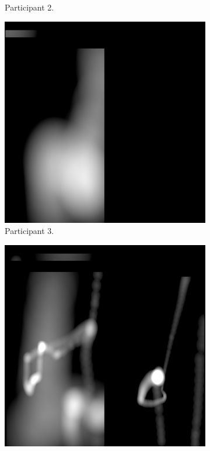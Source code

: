 \begin{figure}[!ht]
\begin{subfigure}[b]{0.24\textwidth}
        \caption{Participant 2.}
    \end{subfigure}
    \hfill
    \begin{subfigure}[b]{0.24\textwidth}
        \centering
        \includegraphics[width=\textwidth]{img/data/Panel11/single/3.png}
        \caption{Participant 3.}
    \end{subfigure}
    \hfill
    \begin{subfigure}[b]{0.24\textwidth}
        \centering
        \includegraphics[width=\textwidth]{img/data/Panel11/single/4.png}

\end{subfigure}
\end{figure}
